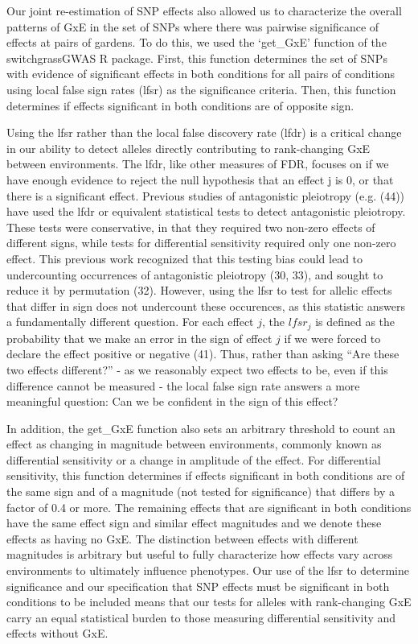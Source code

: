 \documentclass[
  9pt,
  twocolumn,
  twoside]{pnas-new}
\begin{document}
Our joint re-estimation of SNP effects also allowed us to characterize
the overall patterns of GxE in the set of SNPs where there was pairwise
significance of effects at pairs of gardens. To do this, we used the
`get\_GxE' function of the switchgrassGWAS R package. First, this
function determines the set of SNPs with evidence of significant effects
in both conditions for all pairs of conditions using local false sign
rates (lfsr) as the significance criteria. Then, this function
determines if effects significant in both conditions are of opposite
sign.

Using the lfsr rather than the local false discovery rate (lfdr) is a
critical change in our ability to detect alleles directly contributing
to rank-changing GxE between environments. The lfdr, like other measures
of FDR, focuses on if we have enough evidence to reject the null
hypothesis that an effect j is 0, or that there is a significant effect.
Previous studies of antagonistic pleiotropy (e.g. (44)) have used the
lfdr or equivalent statistical tests to detect antagonistic pleiotropy.
These tests were conservative, in that they required two non-zero
effects of different signs, while tests for differential sensitivity
required only one non-zero effect. This previous work recognized that
this testing bias could lead to undercounting occurrences of
antagonistic pleiotropy (30, 33), and sought to reduce it by permutation
(32). However, using the lfsr to test for allelic effects that differ in
sign does not undercount these occurences, as this statistic answers a
fundamentally different question. For each effect \(j\), the \(lfsr_j\)
is defined as the probability that we make an error in the sign of
effect \(j\) if we were forced to declare the effect positive or
negative (41). Thus, rather than asking ``Are these two effects
different?'' - as we reasonably expect two effects to be, even if this
difference cannot be measured - the local false sign rate answers a more
meaningful question: Can we be confident in the sign of this effect?

In addition, the get\_GxE function also sets an arbitrary threshold to
count an effect as changing in magnitude between environments, commonly
known as differential sensitivity or a change in amplitude of the
effect. For differential sensitivity, this function determines if
effects significant in both conditions are of the same sign and of a
magnitude (not tested for significance) that differs by a factor of 0.4
or more. The remaining effects that are significant in both conditions
have the same effect sign and similar effect magnitudes and we denote
these effects as having no GxE. The distinction between effects with
different magnitudes is arbitrary but useful to fully characterize how
effects vary across environments to ultimately influence phenotypes. Our
use of the lfsr to determine significance and our specification that SNP
effects must be significant in both conditions to be included means that
our tests for alleles with rank-changing GxE carry an equal statistical
burden to those measuring differential sensitivity and effects without
GxE.
\end{document}
